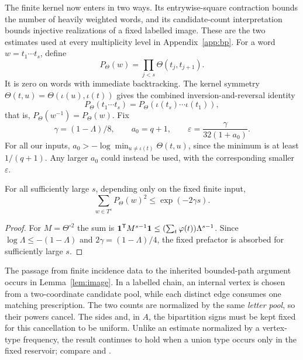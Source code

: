The finite kernel now enters in two ways. Its entrywise-square contraction bounds the number of heavily weighted words, and its candidate-count interpretation bounds injective realizations of a fixed labelled image. These are the two estimates used at every multiplicity level in Appendix~\ref{app:bp}.
For a word $w=t_1\cdots t_s$, define
\[
 P_\Theta(w)=\prod_{j<s}\Theta(t_j,t_{j+1}).
\]
It is zero on words with immediate backtracking. The kernel symmetry $\Theta(t,u)=\Theta(\iota(u),\iota(t))$ gives the combined inversion-and-reversal identity
\[
 P_\Theta(t_1\cdots t_s)=P_\Theta(\iota(t_s)\cdots\iota(t_1)),
\]
that is, $P_\Theta(w^{-1})=P_\Theta(w)$. Fix
\begin{equation}\label{eq:epsilon}
 \gamma=(1-\Lambda)/8,\qquad a_0=q+1,\qquad
 \varepsilon=\frac{\gamma}{32(1+a_0)}.
\end{equation}
For all our inputs, $a_0> -\log\min_{u\ne\iota(t)}\Theta(t,u)$, since the minimum is at least $1/(q+1)$. Any larger $a_0$ could instead be used, with the corresponding smaller $\varepsilon$.
\begin{lemma}\label{lem:word-decay}
For all sufficiently large $s$, depending only on the fixed finite input,
\[
 \sum_{w\in T^s}P_\Theta(w)^2\le\exp(-2\gamma s).
\]
\end{lemma}
\begin{proof}
For $M=\Theta^{\circ2}$ the sum is $\mathbf1^{\mathsf T}M^{s-1}\mathbf1\le(\sum_t\varphi(t))\Lambda^{s-1}$. Since $\log\Lambda\le-(1-\Lambda)$ and $2\gamma=(1-\Lambda)/4$, the fixed prefactor is absorbed for sufficiently large $s$.
\end{proof}

The passage from finite incidence data to the inherited bounded-path argument occurs in Lemma~\ref{lem:image}. In a labelled chain, an internal vertex is chosen from a two-coordinate candidate pool, while each distinct edge consumes one matching prescription. The two counts are normalized by the same \emph{letter pool}, so their powers cancel. The sides and, in $A$, the bipartition signs must be kept fixed for this cancellation to be uniform. Unlike an estimate normalized by a vertex-type frequency, the result continues to hold when a union type occurs only in the fixed reservoir; compare \cite[equation~(4.11)]{OAI197a} and \cite[proof of Proposition~7.9(c)]{MD26}.

